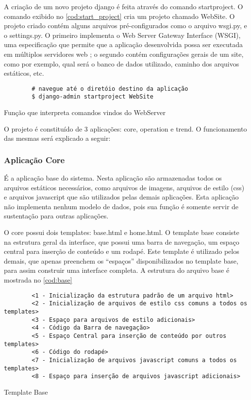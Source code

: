 	A criação de um novo projeto django é feita através do comando startproject. O comando exibido no \autoref{cod:start_project} cria um projeto chamado WebSite. O projeto criado contém alguns arquivos pré-configurados como o arquivo wsgi.py, e o settings.py. O primeiro implementa o Web Server Gateway Interface (WSGI), uma especificação que permite que a aplicação desenvolvida possa ser executada em múltiplos servidores web \cite{klaus2012}; o segundo contém configurações gerais de um site, como por exemplo, qual será o banco de dados utilizado, caminho dos arquivos estáticos, etc.
	
	\begin{listing}[!htb]
		\begin{verbatim}
		# navegue até o diretóio destino da aplicação
		$ django-admin startproject WebSite
		\end{verbatim}
		\caption{Função que interpreta comandos vindos do WebServer}
		\label{cod:start_project}
	\end{listing}
	
	O projeto é constituído de 3 aplicações: core, operation e trend. O funcionamento das mesmas será explicado a seguir:
	
	\subsubsection{Aplicação Core}
	É a aplicação base do sistema. Nesta aplicação são armazenadas todos os arquivos estáticos necessários, como arquivos de imagens, arquivos de estilo (css) e arquivos javascript que são utilizados pelas demais aplicações. Esta aplicação não implementa nenhum modelo de dados, pois sua função é somente servir de sustentação para outras aplicações.
	
	O core possui dois templates: base.html e home.html. O template base consiste na estrutura geral da interface, que possui uma barra de navegação, um espaço central para inserção de conteúdo e um rodapé. Este template é utilizado pelos demais, que apenas preenchem os ``espaços'' disponibilizados no template base, para assim construir uma interface completa. A estrutura do arquivo base é mostrada no \autoref{cod:base}
	
	\begin{listing}[!htb]
		\begin{verbatim}
		<1 - Inicialização da estrutura padrão de um arquivo html>
		<2 - Inicialização de arquivos de estilo css comuns a todos os templates>
		<3 - Espaço para arquivos de estilo adicionais>
		<4 - Código da Barra de navegação>
		<5 - Espaço Central para inserção de conteúdo por outros templates>
		<6 - Código do rodapé>
		<7 - Inicialização de arquivos javascript comuns a todos os templates>
		<8 - Espaço para inserção de arquivos javascript adicionais>
		\end{verbatim}
		\caption{Template Base}
		\label{cod:base}
	\end{listing}
	
